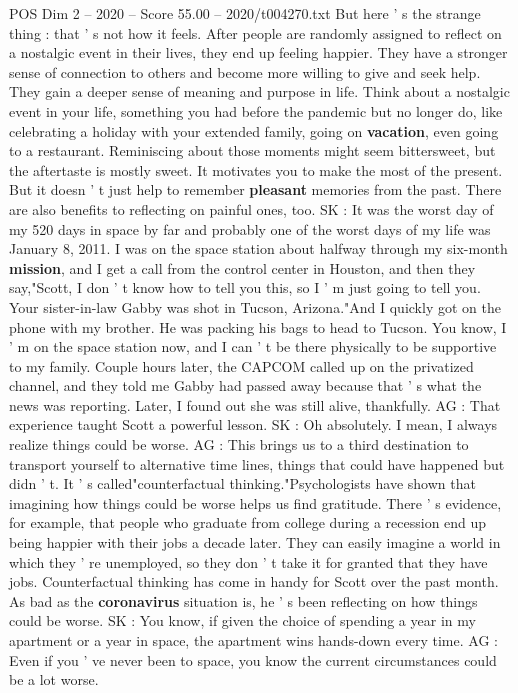 \begin{textsample}{POS Dim 2 – 2020 – Score 55.00 – 2020/t004270.txt}
But here ' s the strange thing : that ' s not how it feels.
After people are randomly assigned to reflect on a nostalgic event in their lives, they end up feeling happier.
They have a stronger sense of connection to others and become more willing to give and seek help.
They gain a deeper sense of meaning and purpose in life.
Think about a nostalgic event in your life, something you had before the pandemic but no longer do, like celebrating a holiday with your extended family, going on \textbf{vacation}, even going to a restaurant.
Reminiscing about those moments might seem bittersweet, but the aftertaste is mostly sweet.
It motivates you to make the most of the present.
But it doesn ' t just help to remember \textbf{pleasant} memories from the past.
There are also benefits to reflecting on painful ones, too.
SK : It was the worst day of my 520 days in space by far and probably one of the worst days of my life was January 8, 2011.
I was on the space station about halfway through my six-month \textbf{mission}, and I get a call from the control center in Houston, and then they say,"Scott, I don ' t know how to tell you this, so I ' m just going to tell you.
Your sister-in-law Gabby was shot in Tucson, Arizona."And I quickly got on the phone with my brother.
He was packing his bags to head to Tucson.
You know, I ' m on the space station now, and I can ' t be there physically to be supportive to my family.
Couple hours later, the CAPCOM called up on the privatized channel, and they told me Gabby had passed away because that ' s what the news was reporting.
Later, I found out she was still alive, thankfully.
AG : That experience taught Scott a powerful lesson.
SK : Oh absolutely.
I mean, I always realize things could be worse.
AG : This brings us to a third destination to transport yourself to alternative time lines, things that could have happened but didn ' t.
It ' s called"counterfactual thinking."Psychologists have shown that imagining how things could be worse helps us find gratitude.
There ' s evidence, for example, that people who graduate from college during a recession end up being happier with their jobs a decade later.
They can easily imagine a world in which they ' re unemployed, so they don ' t take it for granted that they have jobs.
Counterfactual thinking has come in handy for Scott over the past month.
As bad as the \textbf{coronavirus} situation is, he ' s been reflecting on how things could be worse.
SK : You know, if given the choice of spending a year in my apartment or a year in space, the apartment wins hands-down every time.
AG : Even if you ' ve never been to space, you know the current circumstances could be a lot worse.

\end{textsample}
